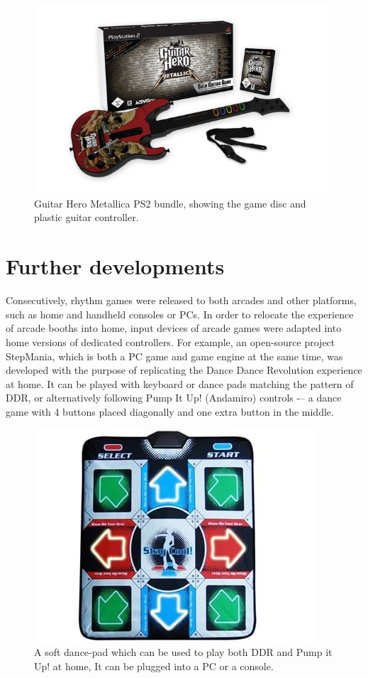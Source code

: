 \begin{figure}[h]
    \centering\includegraphics[scale=0.6]{obrazki/gh2bundle.jpg}
    \caption{Guitar Hero Metallica PS2 bundle, showing the game disc and plastic guitar controller. \cite{gh2bundle}}
    \label{fig:gh2_bundle}
\end{figure}

\section{Further developments}
Consecutively, rhythm games were released to both arcades and other platforms, such as home and handheld consoles or PCs. In order to relocate the experience of arcade booths into home, input devices of arcade games were adapted into home versions of dedicated controllers. For example, an open-source project StepMania, which is both a PC game and game engine at the same time, was developed with the purpose of replicating the Dance Dance Revolution experience at home. It can be played with keyboard or dance pads matching the pattern of DDR, or alternatively following Pump It Up! (Andamiro) controls -– a dance game with 4 buttons placed diagonally and one extra button in the middle.

\begin{figure}[h]
    \centering\includegraphics[scale=0.7]{obrazki/ddrsoftpad.jpg}
    \caption{A soft dance-pad which can be used to play both DDR and Pump it Up! at home, It can be plugged into a PC or a console. \cite{ddrsoftpad}}
    \label{fig:ddr_softpad}
\end{figure}

